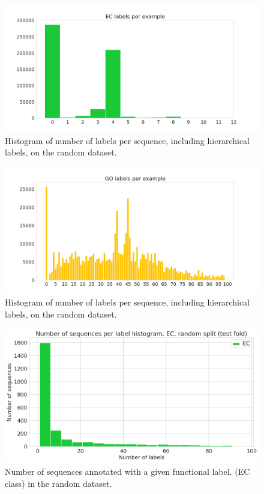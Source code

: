 \clearpage
\begin{figure}[htbp]
\centering
  \includegraphics[width=\textwidth]{ec_label_distribution.png}
  \caption{Histogram of number of labels per sequence, including hierarchical labels, on the random dataset.}
\end{figure}
\begin{figure}[htbp]
\centering
  \includegraphics[width=\textwidth]{go_label_distribution.png}
  \caption{Histogram of number of labels per sequence, including hierarchical labels, on the random dataset.}
\end{figure}
\begin{figure}[htbp]
\centering
  \includegraphics[width=\textwidth]{sequences_per_label_ec_random.png}
  \caption{Number of sequences annotated with a given functional label. (EC class) in the random dataset.}
\end{figure}
